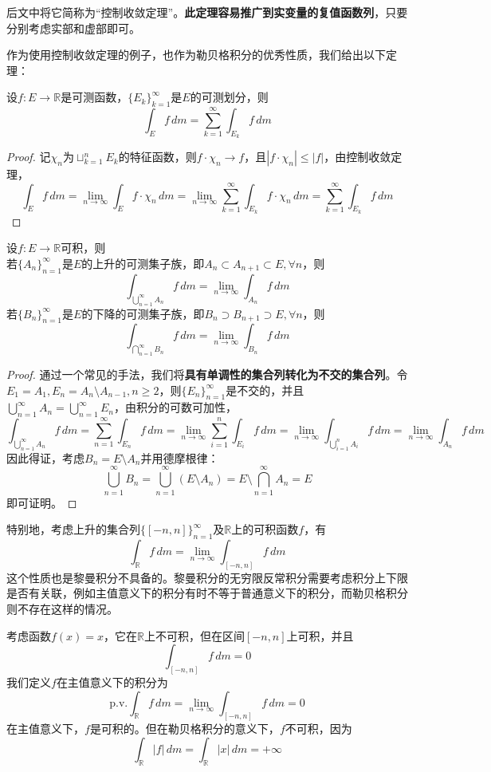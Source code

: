 后文中将它简称为“控制收敛定理”。\textbf{此定理容易推广到实变量的复值函数列}，只要分别考虑实部和虚部即可。

作为使用控制收敛定理的例子，也作为勒贝格积分的优秀性质，我们给出以下定理：
\begin{theorem}[勒贝格积分的可数可加性]
    设$f:E\to\mathbb{R}$是可测函数，$\{E_k\}_{k=1}^{\infty}$是$E$的可测划分，则
    \[\int_{E}f\,dm=\sum_{k=1}^{\infty}\int_{E_k}f\,dm\]
\end{theorem}
\begin{proof}
    记$\chi_n$为$\sqcup_{k=1}^n E_k$的特征函数，则$f\cdot\chi_n\to f$，且$|f\cdot\chi_n|\leq |f|$，由控制收敛定理，
    \[\int_{E}f\,dm=\lim_{n\to\infty}\int_{E}f\cdot\chi_n\,dm=\lim_{n\to\infty}\sum_{k=1}^{\infty}\int_{E_k}f\cdot\chi_n\,dm=\sum_{k=1}^{\infty}\int_{E_k}f\,dm\]
\end{proof}
\begin{corollary}
    设$f:E\to\mathbb{R}$可积，则\\
    若$\{A_n\}_{n=1}^{\infty}$是$E$的上升的可测集子族，即$A_n\subset A_{n+1}\subset E,\forall n$，则
    \[\int_{\bigcup_{n=1}^{\infty}A_n}f\,dm=\lim_{n\to\infty}\int_{A_n}f\,dm\]
    若$\{B_n\}_{n=1}^{\infty}$是$E$的下降的可测集子族，即$B_n\supset B_{n+1}\supset E,\forall n$，则
    \[\int_{\bigcap_{n=1}^{\infty}B_n}f\,dm=\lim_{n\to\infty}\int_{B_n}f\,dm\]
\end{corollary}
\begin{proof}
    通过一个常见的手法，我们将\textbf{具有单调性的集合列转化为不交的集合列}。令$E_1=A_1,E_n=A_n\setminus A_{n-1},n\geq 2$，则$\{E_n\}_{n=1}^{\infty}$是不交的，并且$\bigcup_{n=1}^{\infty}A_n=\bigcup_{n=1}^{\infty}E_n$，由积分的可数可加性，
    \[\int_{\bigcup_{n=1}^{\infty}A_n}f\,dm=\sum_{n=1}^{\infty}\int_{E_n}f\,dm=\lim_{n\to\infty}\sum_{i=1}^{n}\int_{E_i}f\,dm=\lim_{n\to\infty}\int_{\bigcup_{i=1}^{n}A_i}f\,dm=\lim_{n\to\infty}\int_{A_n}f\,dm\]
    因此得证，考虑$B_n=E\setminus A_n$并用德摩根律：
    \[\bigcup_{n=1}^{\infty}B_n=\bigcup_{n=1}^{\infty}(E\setminus A_n)=E\setminus \bigcap_{n=1}^{\infty}A_n=E\]
    即可证明。
\end{proof}

特别地，考虑上升的集合列$\{[-n,n]\}_{n=1}^{\infty}$及$\mathbb{R}$上的可积函数$f$，有
\[\int_{\mathbb{R}}f\,dm=\lim_{n\to\infty}\int_{[-n,n]}f\,dm\]
这个性质也是黎曼积分不具备的。黎曼积分的无穷限反常积分需要考虑积分上下限是否有关联，例如主值意义下的积分有时不等于普通意义下的积分，而勒贝格积分则不存在这样的情况。

\begin{example}
    考虑函数$f(x)=x$，它在$\mathbb{R}$上不可积，但在区间$[-n,n]$上可积，并且\[\int_{[-n,n]}f\,dm=0\]
    我们定义$f$在主值意义下的积分为
    \[\mathrm{p.v.}\int_{\mathbb{R}}f\,dm=\lim_{n\to\infty}\int_{[-n,n]}f\,dm=0\]
    在主值意义下，$f$是可积的。但在勒贝格积分的意义下，$f$不可积，因为
    \[\int_{\mathbb{R}}|f|\,dm=\int_{\mathbb{R}}|x|\,dm=+\infty\]
\end{example}

